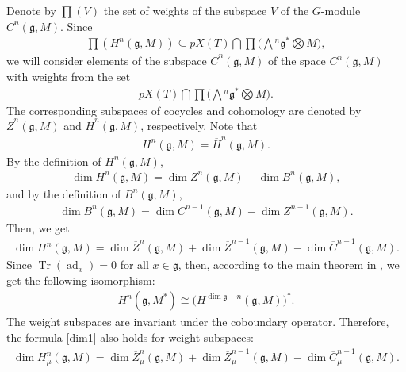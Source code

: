 \documentclass[10pt,a4paper]{amsart}
\numberwithin{equation}{section}
\begin{document}
Denote by $\prod(V)$
the set of weights of the subspace $V$ of the $G$-module $C^{n}(\mathfrak{g},M)$.
Since
\begin{gather*}
\prod(H^n(\mathfrak{g},M))\subseteq
pX(T)\bigcap\prod\Big(\bigwedge{^n}\mathfrak{g}^*\bigotimes M\Big),
\end{gather*}
we will consider
elements of the subspace $\overline{C}^n(\mathfrak{g},M)$ of the space $C^n(\mathfrak{g},M)$ with weights from the set
\begin{gather*}
pX(T)\bigcap\prod\Big(\bigwedge{^n}\mathfrak{g}^*\bigotimes M\Big).
\end{gather*}
The corresponding subspaces of cocycles
and cohomology are denoted by $\overline{Z}^n\!(\mathfrak{g},M)$ and $\overline{H}^n\!(\mathfrak{g},M)$, respectively. Note that
\begin{gather*}
H^n(\mathfrak{g},M)=\overline{H}^n(\mathfrak{g},M).
\end{gather*}
By the definition of $H^n(\mathfrak{g},M)$,
\begin{gather*}\dim H^n(\mathfrak{g},M)=\dim Z^n(\mathfrak{g},M)-\dim B^{n}(\mathfrak{g},M),\end{gather*} and by the definition of $B^{n}(\mathfrak{g},M)$,
\begin{gather*}\dim B^{n}(\mathfrak{g},M)=\dim C^{n-1}(\mathfrak{g},M)-\dim Z^{n-1}(\mathfrak{g},M).\end{gather*} Then, we get
\begin{gather}
\dim H^n(\mathfrak{g},M)=\dim \overline{Z}^n(\mathfrak{g},M)+\dim
\overline{Z}^{n-1}(\mathfrak{g},M)-\dim \overline{C}^{n-1}(\mathfrak{g},M).\label{dim1}
\end{gather}
Since $\operatorname{Tr}(\operatorname{ad}_x)=0$ for all $x\in \mathfrak{g}$, then, according to the main theorem in \cite[p.~639]{H70},
we get the following isomorphism:
\begin{gather}
H^n(\mathfrak{g},M^*)\cong \big(H^{\dim \mathfrak{g}-n}(\mathfrak{g},M)\big)^*.\label{is1}
\end{gather}
The weight subspaces are invariant under the coboundary operator. Therefore, the formula \eqref{dim1} also holds for weight
subspaces:
\begin{gather}
\dim H^n_{\mu}(\mathfrak{g},M)=\dim \overline{Z}^n_{\mu}(\mathfrak{g},M)+\dim
\overline{Z}^{n-1}_{\mu}(\mathfrak{g},M)-\dim \overline{C}^{n-1}_{\mu}(\mathfrak{g},M).\label{dim3}
\end{gather}
\end{document}
